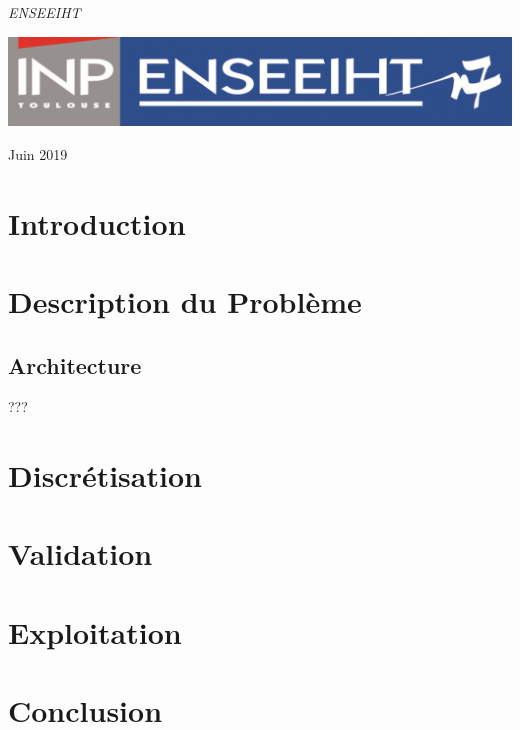 \documentclass[a4paper,oneside]{article}
\begin{document}
\begin{titlepage}
	\vspace{0.5\baselineskip} %

	\textit{ENSEEIHT} %

	\vfill %


	\includegraphics[scale=0.8]{logoN7.png} %

	\vspace{0.3\baselineskip} %

Juin 2019 %
\end{titlepage}
\newpage

\tableofcontents
\newpage

\section{Introduction}

\section{Description du Problème}

\subsection{Architecture}
???


\section{Discrétisation}



\section{Validation}


\section{Exploitation}


\section{Conclusion}
\end{document}
